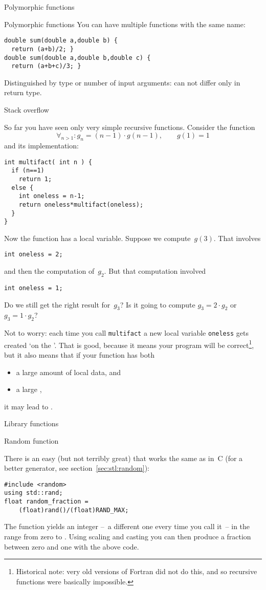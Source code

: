  {Polymorphic functions}
\label{sec:polyfunc}

\begin{block}{Polymorphic functions}
  \label{sl:func-poly}
  You can have multiple functions with the same name:
\begin{lstlisting}
double sum(double a,double b) {
  return (a+b)/2; }
double sum(double a,double b,double c) {
  return (a+b+c)/3; }
\end{lstlisting}
Distinguished by type or number of input arguments: can not differ only in return type.
\end{block}

 {Stack overflow}

So far you have seen only very simple recursive functions. Consider
the function
\[ \forall_{n>1}\colon g_n = (n-1)\cdot g(n-1),\qquad g(1)=1 \]
and its implementation:
\begin{lstlisting}
int multifact( int n ) {
  if (n==1)
    return 1;
  else {
    int oneless = n-1;
    return oneless*multifact(oneless);
  }
}
\end{lstlisting}
Now the function has a local variable. Suppose we compute~$g(3)$. That
involves
\begin{lstlisting}
int oneless = 2;
\end{lstlisting}
and then the computation of~$g_2$. But that computation involved 
\begin{lstlisting}
int oneless = 1;
\end{lstlisting}
Do we still get the right result for~$g_3$? Is it going to compute
$g_3=2\cdot g_2$ or $g_3=1\cdot g_2$?

Not to worry: each time you call \lstinline{multifact} a new local variable
\lstinline{oneless} gets created `on the '. That is good, because it means your program
will be correct\footnote{Historical note: very old versions of Fortran
  did not do this, and so recursive functions were basically
  impossible.}, but it also means that if your function has both
\begin{itemize}
\item a large amount of local data, and
\item a large ,
\end{itemize}
it may lead to .

 {Library functions}

 {Random function}
\label{sec:crand}

There is an easy (but not terribly great)
that works the same as in~C (for a better
generator, see section~\ref{sec:stl:random}):
%
\begin{lstlisting}
#include <random>
using std::rand;
float random_fraction =
    (float)rand()/(float)RAND_MAX;
\end{lstlisting}
%
The function  yields an integer --~a different one
every time you call it~-- in the range from zero to
.
Using scaling and casting you can then produce a fraction between zero
and one with the above code.

